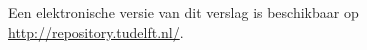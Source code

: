 \begin{titlepage}
\begin{center}
\bigskip
\bigskip

\bigskip
\bigskip
Een elektronische versie van dit verslag is beschikbaar op \url{http://repository.tudelft.nl/}.

\end{center}

\end{titlepage}